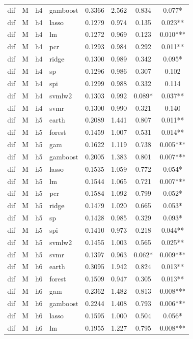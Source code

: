 \begin{ThreePartTable}
\begin{longtable}[t]{llclcccc}
dif & M & h4 & gamboost & 0.3366 & 2.562 & 0.834 & 0.077*\\
dif & M & h4 & lasso & 0.1279 & 0.974 & 0.135 & 0.023**\\
dif & M & h4 & lm & 0.1272 & 0.969 & 0.123 & 0.010***\\
dif & M & h4 & pcr & 0.1293 & 0.984 & 0.292 & 0.011**\\
dif & M & h4 & ridge & 0.1300 & 0.989 & 0.342 & 0.095*\\
dif & M & h4 & sp & 0.1296 & 0.986 & 0.307 & 0.102\\
dif & M & h4 & spi & 0.1299 & 0.988 & 0.332 & 0.114\\
dif & M & h4 & svmlw2 & 0.1303 & 0.992 & 0.089* & 0.037**\\
dif & M & h4 & svmr & 0.1300 & 0.990 & 0.321 & 0.140\\
\addlinespace
dif & M & h5 & earth & 0.2089 & 1.441 & 0.807 & 0.011**\\
dif & M & h5 & forest & 0.1459 & 1.007 & 0.531 & 0.014**\\
dif & M & h5 & gam & 0.1622 & 1.119 & 0.738 & 0.005***\\
dif & M & h5 & gamboost & 0.2005 & 1.383 & 0.801 & 0.007***\\
dif & M & h5 & lasso & 0.1535 & 1.059 & 0.772 & 0.054*\\
dif & M & h5 & lm & 0.1544 & 1.065 & 0.721 & 0.007***\\
dif & M & h5 & pcr & 0.1584 & 1.092 & 0.799 & 0.052*\\
dif & M & h5 & ridge & 0.1479 & 1.020 & 0.665 & 0.053*\\
dif & M & h5 & sp & 0.1428 & 0.985 & 0.329 & 0.093*\\
dif & M & h5 & spi & 0.1410 & 0.973 & 0.218 & 0.044**\\
dif & M & h5 & svmlw2 & 0.1455 & 1.003 & 0.565 & 0.025**\\
dif & M & h5 & svmr & 0.1397 & 0.963 & 0.062* & 0.009***\\
\addlinespace
dif & M & h6 & earth & 0.3095 & 1.942 & 0.824 & 0.013**\\
dif & M & h6 & forest & 0.1509 & 0.947 & 0.305 & 0.013**\\
dif & M & h6 & gam & 0.2362 & 1.482 & 0.813 & 0.008***\\
dif & M & h6 & gamboost & 0.2244 & 1.408 & 0.793 & 0.006***\\
dif & M & h6 & lasso & 0.1595 & 1.000 & 0.504 & 0.056*\\
dif & M & h6 & lm & 0.1955 & 1.227 & 0.795 & 0.008***\\

\end{longtable}
\end{ThreePartTable}
